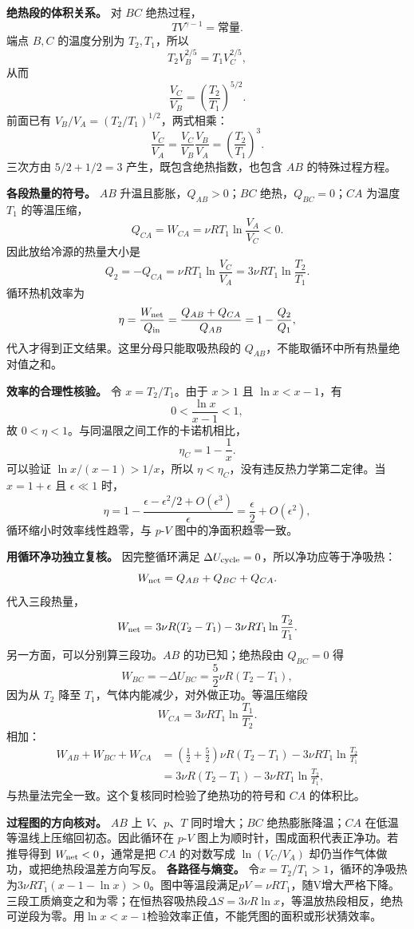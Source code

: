 \documentclass[12pt,a4paper,UTF8]{ctexart}
\begin{document}
\textbf{绝热段的体积关系。} 对 \(BC\) 绝热过程， \[
TV^{\gamma-1}=\text{常量}.
\] 端点 \(B,C\) 的温度分别为 \(T_2,T_1\)，所以 \[
T_2V_B^{2/5}=T_1V_C^{2/5},
\] 从而 \[
\frac{V_C}{V_B}=\left(\frac{T_2}{T_1}\right)^{5/2}.
\] 前面已有 \(V_B/V_A=(T_2/T_1)^{1/2}\)，两式相乘： \[
\frac{V_C}{V_A}
=\frac{V_C}{V_B}\frac{V_B}{V_A}
=\left(\frac{T_2}{T_1}\right)^3.
\] 三次方由 \(5/2+1/2=3\) 产生，既包含绝热指数，也包含 \(AB\)
的特殊过程方程。

\textbf{各段热量的符号。} \(AB\) 升温且膨胀，\(Q_{AB}>0\)；\(BC\)
绝热，\(Q_{BC}=0\)；\(CA\) 为温度 \(T_1\) 的等温压缩， \[
Q_{CA}=W_{CA}=\nu RT_1\ln\frac{V_A}{V_C}<0.
\] 因此放给冷源的热量大小是 \[
Q_2=-Q_{CA}
=\nu RT_1\ln\frac{V_C}{V_A}
=3\nu RT_1\ln\frac{T_2}{T_1}.
\] 循环热机效率为 \[
\eta=\frac{W_{\rm net}}{Q_{\rm in}}
=\frac{Q_{AB}+Q_{CA}}{Q_{AB}}
=1-\frac{Q_2}{Q_1},
\] 代入才得到正文结果。这里分母只能取吸热段的
\(Q_{AB}\)，不能取循环中所有热量绝对值之和。

\textbf{效率的合理性核验。} 令 \(x=T_2/T_1\)。由于 \(x>1\) 且
\(\ln x<x-1\)，有 \[
0<\frac{\ln x}{x-1}<1,
\] 故 \(0<\eta<1\)。与同温限之间工作的卡诺机相比， \[
\eta_C=1-\frac1x.
\] 可以验证 \(\ln x/(x-1)>1/x\)，所以
\(\eta<\eta_C\)，没有违反热力学第二定律。当 \(x=1+\epsilon\) 且
\(\epsilon\ll1\) 时， \[
\eta=1-\frac{\epsilon-\epsilon^2/2+O(\epsilon^3)}{\epsilon}
=\frac\epsilon2+O(\epsilon^2),
\] 循环缩小时效率线性趋零，与 \(p\)-\(V\) 图中的净面积趋零一致。

\textbf{用循环净功独立复核。} 因完整循环满足
\(\Delta U_{\rm cycle}=0\)，所以净功应等于净吸热： \[
W_{\rm net}=Q_{AB}+Q_{BC}+Q_{CA}.
\] 代入三段热量， \[
W_{\rm net}
=3\nu R(T_2-T_1)
-3\nu RT_1\ln\frac{T_2}{T_1}.
\] 另一方面，可以分别算三段功。\(AB\) 的功已知；绝热段由 \(Q_{BC}=0\) 得
\[
W_{BC}=-\Delta U_{BC}
=\frac52\nu R(T_2-T_1),
\] 因为从 \(T_2\) 降至 \(T_1\)，气体内能减少，对外做正功。等温压缩段 \[
W_{CA}=3\nu RT_1\ln\frac{T_1}{T_2}.
\] 相加： \[
\begin{aligned}
W_{AB}+W_{BC}+W_{CA}
&=\left(\frac12+\frac52\right)\nu R(T_2-T_1)
-3\nu RT_1\ln\frac{T_2}{T_1}\\
&=3\nu R(T_2-T_1)
-3\nu RT_1\ln\frac{T_2}{T_1},
\end{aligned}
\] 与热量法完全一致。这个复核同时检验了绝热功的符号和 \(CA\) 的体积比。

\textbf{过程图的方向核对。} \(AB\) 上 \(V\)、\(p\)、\(T\)
同时增大；\(BC\) 绝热膨胀降温；\(CA\)
在低温等温线上压缩回初态。因此循环在 \(p\)-\(V\)
图上为顺时针，围成面积代表正净功。若推导得到 \(W_{\rm net}<0\)，通常是把
\(CA\) 的对数写成 \(\ln(V_C/V_A)\)
却仍当作气体做功，或把绝热段温差方向写反。 \textbf{各路径与熵变。}
令\(x=T_2/T_1>1\)，循环的净吸热为\(3\nu RT_1(x-1-\ln x)>0\)。图中等温段满足\(pV=\nu RT_1\)，随V增大严格下降。三段工质熵变之和为零；在恒热容吸热段\(\Delta S=3\nu R\ln x\)，等温放热段相反，绝热可逆段为零。用\(\ln x<x-1\)检验效率正值，不能凭图的面积或形状猜效率。
\end{document}
